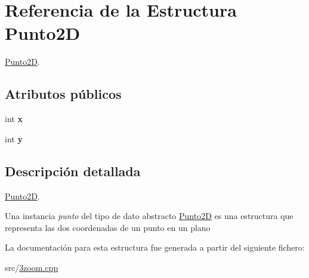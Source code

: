 \hypertarget{structPunto2D}{}\section{Referencia de la Estructura Punto2D}
\label{structPunto2D}


\hyperlink{structPunto2D}{Punto2D}.  


\subsection*{Atributos públicos}
\begin{DoxyCompactItemize}
\item 
\mbox{\label{structPunto2D_a67b4595a093014de28ade1e24b8b5771}} 
int {\bfseries x}
\item 
\mbox{\label{structPunto2D_a83cf0bfe057390479b85ac1d107637c0}} 
int {\bfseries y}
\end{DoxyCompactItemize}


\subsection{Descripción detallada}
\hyperlink{structPunto2D}{Punto2D}. 

Una instancia {\itshape punto} del tipo de dato abstracto {\ttfamily \hyperlink{structPunto2D}{Punto2D}} es una estructura que representa las dos coordenadas de un punto en un plano 

La documentación para esta estructura fue generada a partir del siguiente fichero\+:\begin{DoxyCompactItemize}
\item 
src/\hyperlink{3zoom_8cpp}{3zoom.\+cpp}\end{DoxyCompactItemize}
